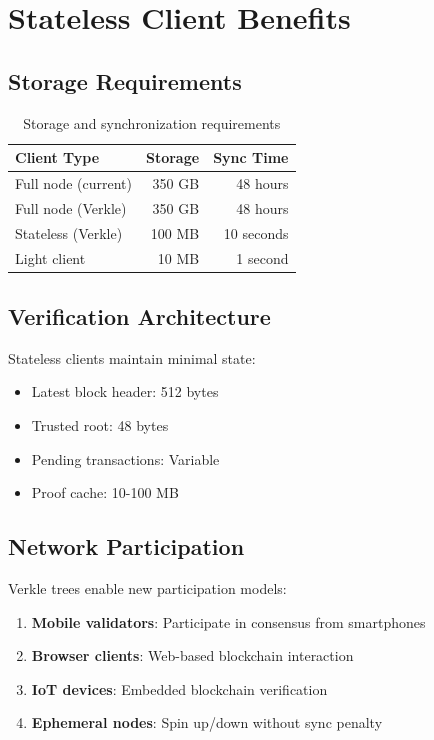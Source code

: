 \section{Stateless Client Benefits}


\subsection{Storage Requirements}

\begin{table}[H]
\centering
\begin{tabular}{@{}lrr@{}}
\toprule
\textbf{Client Type} & \textbf{Storage} & \textbf{Sync Time} \\
\midrule
Full node (current) & 350 GB & 48 hours \\
Full node (Verkle) & 350 GB & 48 hours \\
Stateless (Verkle) & 100 MB & 10 seconds \\
Light client & 10 MB & 1 second \\
\bottomrule
\end{tabular}
\caption{Storage and synchronization requirements}
\label{tab:storage}
\end{table}

\subsection{Verification Architecture}

Stateless clients maintain minimal state:
\begin{itemize}
    \item Latest block header: 512 bytes
    \item Trusted root: 48 bytes
    \item Pending transactions: Variable
    \item Proof cache: 10-100 MB
\end{itemize}

\subsection{Network Participation}

Verkle trees enable new participation models:
\begin{enumerate}
    \item \textbf{Mobile validators}: Participate in consensus from smartphones
    \item \textbf{Browser clients}: Web-based blockchain interaction
    \item \textbf{IoT devices}: Embedded blockchain verification
    \item \textbf{Ephemeral nodes}: Spin up/down without sync penalty
\end{enumerate}

